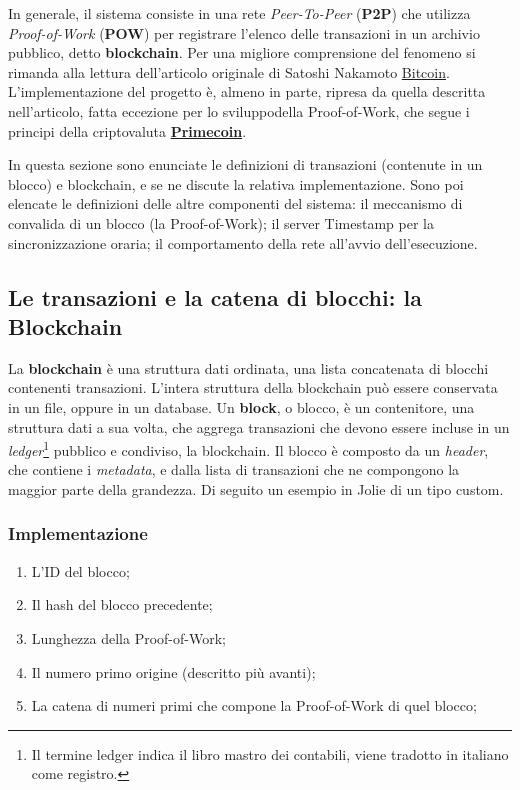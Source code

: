 In generale, il sistema consiste in una rete \textit{Peer-To-Peer} (\textbf{P2P}) che utilizza \textit{Proof-of-Work} (\textbf{POW}) per registrare l'elenco delle transazioni in un archivio pubblico, detto \textbf{blockchain}. Per una migliore comprensione del fenomeno si rimanda alla lettura dell'articolo originale di Satoshi Nakamoto \href{https://bitcoin.org/bitcoin.pdf}{Bitcoin}. 
L'implementazione del progetto è, almeno in parte, ripresa da quella descritta nell'articolo, fatta eccezione per lo sviluppodella Proof-of-Work, che segue i principi della criptovaluta \href{http://primecoin.io/bin/primecoin-paper.pdf}{\textbf{Primecoin}}.

In questa sezione sono enunciate le definizioni di transazioni (contenute in un blocco) e blockchain, e se ne discute la relativa implementazione. Sono poi elencate le definizioni delle altre componenti del sistema: il meccanismo di convalida di un blocco (la Proof-of-Work); il server Timestamp per la sincronizzazione oraria; il comportamento della rete all'avvio dell'esecuzione.

\subsection{Le transazioni e la catena di blocchi: la Blockchain}
La \textbf{blockchain} è una struttura dati ordinata, una lista concatenata di blocchi contenenti transazioni. L'intera struttura della blockchain può essere conservata in un file, oppure in un database. Un \textbf{block}, o blocco, è un contenitore, una struttura dati a sua volta, che aggrega transazioni che devono essere incluse in un \textit{ledger}\footnote{Il termine ledger indica il libro mastro dei contabili, viene tradotto in italiano come registro.} pubblico e condiviso, la blockchain. 
Il blocco è composto da un \textit{header}, che contiene i \textit{metadata}, e dalla lista di transazioni che ne compongono la maggior parte della grandezza. Di seguito un esempio in Jolie di un tipo custom.
%

%

\subsubsection{Implementazione}
\begin{enumerate}
    \item L'ID del blocco;
    \item Il hash del blocco precedente;
    \item Lunghezza della Proof-of-Work;
    \item Il numero primo origine (descritto più avanti);
    \item La catena di numeri primi che compone la Proof-of-Work di quel blocco;
\end{enumerate}


